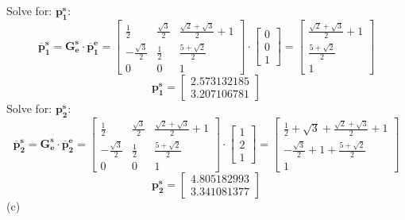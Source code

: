 \documentclass{article}
\begin{document}
Solve for: \(\bm{\mathbf{p^{s}_{1}}}\):
\[
\bm{\mathbf{\overline{p}^{s}_{1}}} = \bm{\mathbf{G^{s}_{e}}} \cdot \bm{\mathbf{\overline{p}^{e}_{1}}} = \begin{bmatrix}
\frac{1}{2} & \frac{\sqrt{3}}{2} & \frac{\sqrt{2} + \sqrt{3}}{2} + 1 \\
-\frac{\sqrt{3}}{2} & \frac{1}{2} & \frac{5+\sqrt{2}}{2} \\
0 & 0 & 1
\end{bmatrix} \cdot \begin{bmatrix} 0 \\ 0 \\ 1 \end{bmatrix} = 
\begin{bmatrix}
    \frac{\sqrt{2} + \sqrt{3}}{2} + 1 \\ \frac{5+\sqrt{2}}{2} \\ 1
\end{bmatrix}\]
\[
\bm{\mathbf{p^{s}_{1}}} = \begin{bmatrix}
    2.573132185 \\ 3.207106781
\end{bmatrix}
\]
Solve for: \(\bm{\mathbf{p^{s}_{2}}}\):
\[
\bm{\mathbf{\overline{p}^{s}_{2}}} = \bm{\mathbf{G^{s}_{e}}} \cdot \bm{\mathbf{\overline{p}^{e}_{2}}} = \begin{bmatrix}
\frac{1}{2} & \frac{\sqrt{3}}{2} & \frac{\sqrt{2} + \sqrt{3}}{2} + 1 \\
-\frac{\sqrt{3}}{2} & \frac{1}{2} & \frac{5+\sqrt{2}}{2} \\
0 & 0 & 1
\end{bmatrix} \cdot \begin{bmatrix} 1 \\ 2 \\ 1 \end{bmatrix} = 
\begin{bmatrix}
    \frac{1}{2} + \sqrt{3} + \frac{\sqrt{2} + \sqrt{3}}{2} + 1 \\ 
    -\frac{\sqrt{3}}{2} + 1 + \frac{5+\sqrt{2}}{2} \\ 1
\end{bmatrix} 
\]
\[
\bm{\mathbf{p^{s}_{2}}} = \begin{bmatrix}
    4.805182993 \\ 3.341081377
\end{bmatrix}
\]
(c)
\end{document}

